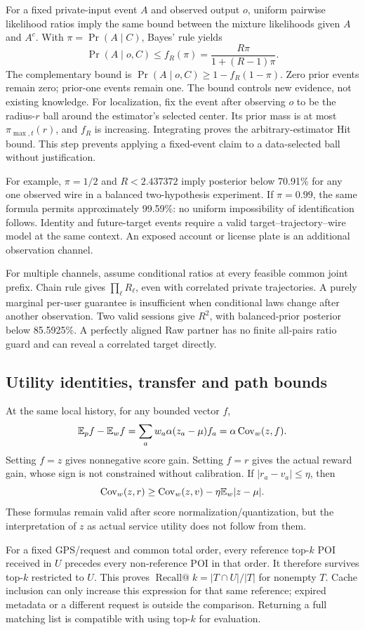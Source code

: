 For a fixed private-input event $A$ and observed output $o$, uniform pairwise
likelihood ratios imply the same bound between the mixture likelihoods given
$A$ and $A^c$. With $\pi=\Pr(A\mid C)$, Bayes' rule yields
\[
\Pr(A\mid o,C)\le
f_R(\pi)=\frac{R\pi}{1+(R-1)\pi}.
\]
The complementary bound is
$\Pr(A\mid o,C)\ge1-f_R(1-\pi)$. Zero prior events remain zero; prior-one
events remain one. The bound controls new evidence, not existing knowledge.
For localization, fix the event after observing $o$ to be the radius-$r$
ball around the estimator's selected center. Its prior mass is at most
$\pi_{\max,t}(r)$, and $f_R$ is increasing. Integrating proves the
arbitrary-estimator Hit bound. This step prevents applying a fixed-event
claim to a data-selected ball without justification.

For example, $\pi=1/2$ and $R<2.437372$ imply posterior below 70.91\%
for any one observed wire in a balanced two-hypothesis experiment. If
$\pi=0.99$, the same formula permits approximately 99.59\%: no uniform
impossibility of identification follows. Identity and future-target
events require a valid target--trajectory--wire model at the same context.
An exposed account or license plate is an additional observation channel.

For multiple channels, assume conditional ratios at every feasible common
joint prefix. Chain rule gives $\prod_\ell R_\ell$, even with correlated
private trajectories. A purely marginal per-user guarantee is insufficient
when conditional laws change after another observation. Two valid sessions
give $R^2$, with balanced-prior posterior below 85.5925\%. A perfectly aligned
Raw partner has no finite all-pairs ratio guard and can reveal a correlated
target directly.

\subsection{Utility identities, transfer and path bounds}
At the same local history, for any bounded vector $f$,
\[
\mathbb E_pf-\mathbb E_wf=\sum_aw_a\alpha(z_a-\mu)f_a
=\alpha\operatorname{Cov}_w(z,f).
\]
Setting $f=z$ gives nonnegative score gain. Setting $f=r$ gives the actual
reward gain, whose sign is not constrained without calibration. If
$|r_a-v_a|\le\eta$, then
\[
\operatorname{Cov}_w(z,r)\ge\operatorname{Cov}_w(z,v)-\eta\mathbb E_w|z-\mu|.
\]
These formulas remain valid after score normalization/quantization, but
the interpretation of $z$ as actual service utility does not follow from them.

For a fixed GPS/request and common total order, every reference top-$k$ POI
received in $U$ precedes every non-reference POI in that order. It therefore
survives top-$k$ restricted to $U$. This proves
$\operatorname{Recall@}k=|T\cap U|/|T|$ for nonempty $T$.
Cache inclusion can only increase this expression for that same reference;
expired metadata or a different request is outside the comparison.
Returning a full matching list is compatible with using top-$k$ for evaluation.

